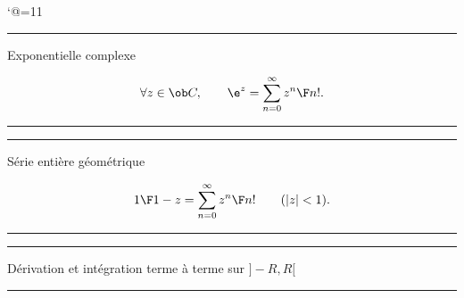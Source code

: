 \catcode`@=11\relax




\vglue-10mm%
\bigskip










\bigskip
{}
\bigskip
{}
\bigskip 
{}
\bigskip
\hrule\smallskip
\centerline{Exponentielle complexe}
$$
\forall z\in\ob C, \qquad \e^z=\sum\limits_{n=0}^\infty{z^n\F n!}.
$$
\hrule\smallskip
{}
\hrule
\smallskip
\centerline{Série entière géométrique}
$$
{1\F1-z}=\sum\limits_{n=0}^\infty{z^n\F n!}\qquad(|z|<1).
$$
\hrule\smallskip
\bigskip
{}
\bigskip
{}

\hrule
\smallskip
\centerline{Dérivation et intégration terme à terme sur $]-R,R[$}
\smallskip
\hrule
\bigskip
{}
\bigskip
{}
\bigskip
{}
\bigskip

\vfill\null
\bye